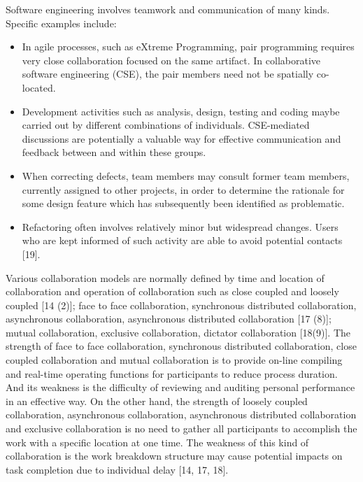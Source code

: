 Software engineering involves teamwork and communication of many kinds. Specific examples include:
\begin{itemize}
\item In agile processes, such as eXtreme Programming, pair programming requires very close collaboration focused on the same artifact. In collaborative software engineering (CSE), the pair members need not be spatially co-located.
\end{itemize}
\begin{itemize}
\item Development activities such as analysis, design, testing and coding maybe carried out by different combinations of individuals. CSE-mediated discussions are potentially a valuable way for effective communication and feedback between and within these groups.
\end{itemize}
\begin{itemize}
\item When correcting defects, team members may consult former team members, currently assigned to other projects, in order to determine the rationale for some design feature which has subsequently been identified as problematic.
\end{itemize}
\begin{itemize}
\item Refactoring often involves relatively minor but widespread changes. Users who are kept informed of such activity are able to avoid potential contacts [19].
\end{itemize}

Various collaboration models are normally defined by time and location of collaboration and operation of collaboration such as close coupled and loosely coupled [14 (2)]; face to face collaboration, synchronous distributed collaboration, asynchronous collaboration, asynchronous distributed collaboration [17 (8)]; mutual collaboration, exclusive collaboration, dictator collaboration [18(9)]. The strength of face to face collaboration, synchronous distributed collaboration, close coupled collaboration and mutual collaboration is to provide on-line compiling and real-time operating functions for participants to reduce process duration. And its weakness is the difficulty of reviewing and auditing personal performance in an effective way. On the other hand, the strength of loosely coupled collaboration, asynchronous collaboration, asynchronous distributed collaboration and exclusive collaboration is no need to gather all participants to accomplish the work with a specific location at one time. The weakness of this kind of collaboration is the work breakdown structure may cause potential impacts on task completion due to individual delay [14, 17, 18].

